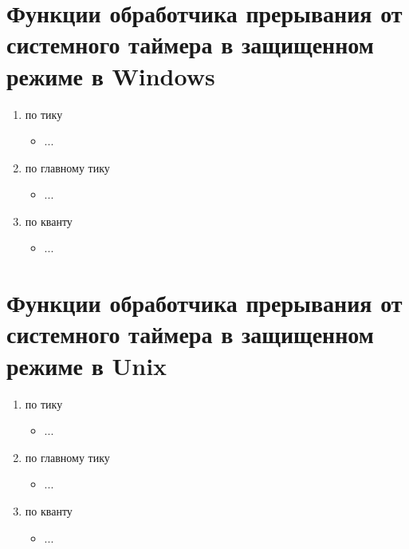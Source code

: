 \section{Функции обработчика прерывания от системного таймера в защищенном режиме в Windows}

\begin{enumerate}
	\item по тику
	\begin{itemize}
		\item ...
	\end{itemize}
	\item по главному тику
	\begin{itemize}
		\item ...
	\end{itemize}
	\item по кванту
	\begin{itemize}
		\item ...
	\end{itemize}
\end{enumerate}

\section{Функции обработчика прерывания от системного таймера в защищенном режиме в Unix}

\begin{enumerate}
	\item по тику
	\begin{itemize}
		\item ...
	\end{itemize}
	\item по главному тику
	\begin{itemize}
		\item ...
	\end{itemize}
	\item по кванту
	\begin{itemize}
		\item ...
	\end{itemize}
\end{enumerate}




